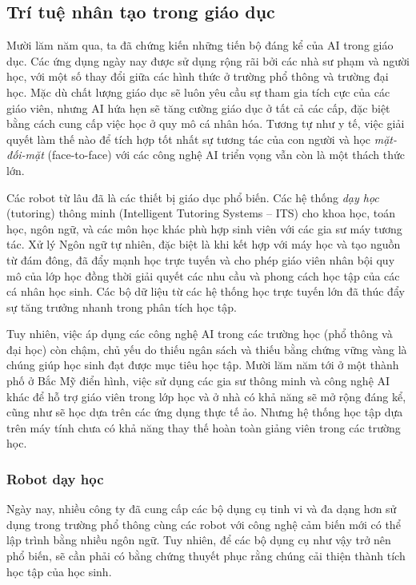 \subsection{Trí tuệ nhân tạo trong giáo dục}
Mười lăm năm qua, ta đã chứng kiến những tiến bộ đáng kể của AI trong giáo dục. Các ứng dụng ngày nay được sử dụng rộng rãi bởi các nhà sư phạm và người học, với một số thay đổi giữa các hình thức ở trường phổ thông và trường đại học. Mặc dù chất lượng giáo dục sẽ luôn yêu cầu sự tham gia tích cực của các giáo viên, nhưng AI hứa hẹn sẽ tăng cường giáo dục ở tất cả các cấp, đặc biệt bằng cách cung cấp việc học ở quy mô cá nhân hóa. Tương tự như y tế, việc giải quyết làm thế nào để tích hợp tốt nhất sự tương tác của con người và học \textit{mặt-đối-mặt} (face-to-face) với các công nghệ AI triển vọng vẫn còn là một thách thức lớn.\par
Các robot từ lâu đã là các thiết bị giáo dục phổ biến. Các hệ thống \textit{dạy học} (tutoring) thông minh (Intelligent Tutoring Systems – ITS) cho khoa học, toán học, ngôn ngữ, và các môn học khác phù hợp sinh viên với các gia sư máy tương tác. Xử lý Ngôn ngữ tự nhiên, đặc biệt là khi kết hợp với máy học và tạo nguồn từ đám đông, đã đẩy mạnh học trực tuyến và cho phép giáo viên nhân bội quy mô của lớp học đồng thời giải quyết các nhu cầu và phong cách học tập của các cá nhân học sinh. Các bộ dữ liệu từ các hệ thống học trực tuyến lớn đã thúc đẩy sự tăng trưởng nhanh trong phân tích học tập.\par
Tuy nhiên, việc áp dụng các công nghệ AI trong các trường học (phổ thông và đại học) còn chậm, chủ yếu do thiếu ngân sách và thiếu bằng chứng vững vàng là chúng giúp học sinh đạt được mục tiêu học tập. Mười lăm năm tới ở một thành phố ở Bắc Mỹ điển hình, việc sử dụng các gia sư thông minh và công nghệ AI khác để hỗ trợ giáo viên trong lớp học và ở nhà có khả năng sẽ mở rộng đáng kể, cũng như sẽ học dựa trên các ứng dụng thực tế ảo. Nhưng hệ thống học tập dựa trên máy tính chưa có khả năng thay thế hoàn toàn giảng viên trong các trường học.\par
\subsubsection{Robot dạy học}
Ngày nay, nhiều công ty đã cung cấp các bộ dụng cụ tinh vi và đa dạng hơn sử dụng trong trường phổ thông cùng các robot với công nghệ cảm biến mới có thể lập trình bằng nhiều ngôn ngữ. Tuy nhiên, để các bộ dụng cụ như vậy trở nên phổ biến, sẽ cần phải có bằng chứng thuyết phục rằng chúng cải thiện thành tích học tập của học sinh.

